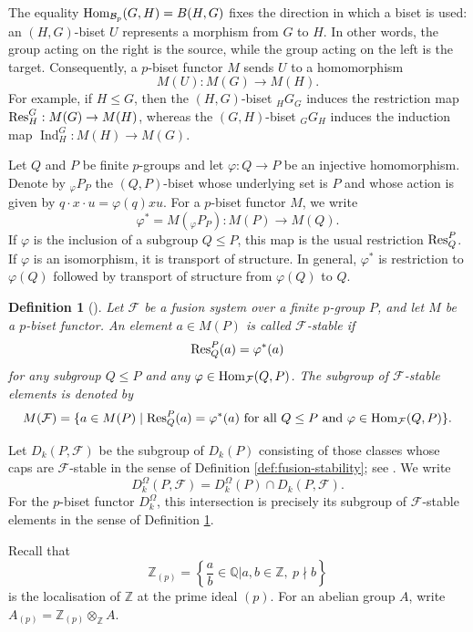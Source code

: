 \documentclass[preprint,12pt,3p]{elsarticle}
\newtheorem{definition}[theorem]{Definition}%
\def\Res{{\rm Res}}
\def\Hom{{\rm Hom}}
\def\F{\mathcal{F}}
\def\Z{\mathbb{Z}}
\begin{document}
The equality $\Hom_{\mathcal{B}_p}(G,H)=B(H,G)$ fixes the direction in which a biset is used: an $(H,G)$-biset $U$ represents a morphism from $G$ to $H$. In other words, the group acting on the right is the source, while the group acting on the left is the target. Consequently, a $p$-biset functor $M$ sends $U$ to a homomorphism
$$
 M(U):M(G)\longrightarrow M(H).
$$
For example, if $H\leq G$, then the $(H,G)$-biset ${}_H G_G$ induces the restriction map $\Res_H^G:M(G)\to M(H)$, whereas the $(G,H)$-biset ${}_G G_H$ induces the induction map $\operatorname{Ind}_H^G:M(H)\to M(G)$.

Let $Q$ and $P$ be finite $p$-groups and let $\varphi:Q\to P$ be an injective homomorphism. Denote by ${}_\varphi P_P$ the $(Q,P)$-biset whose underlying set is $P$ and whose action is given by $q\cdot x\cdot u=\varphi(q)xu$. For a $p$-biset functor $M$, we write
$$
 \varphi^*=M({}_\varphi P_P):M(P)\longrightarrow M(Q).
$$
If $\varphi$ is the inclusion of a subgroup $Q\leq P$, this map is the usual restriction $\Res_Q^P$. If $\varphi$ is an isomorphism, it is transport of structure. In general, $\varphi^*$ is restriction to $\varphi(Q)$ followed by transport of structure from $\varphi(Q)$ to $Q$.

\begin{definition}[{\cite[Definition 2.2]{RY18}}]\label{def:stable-elements}
{\rm Let $\F$ be a fusion system over a finite $p$-group $P$, and let $M$ be a $p$-biset functor. An element $a\in M(P)$ is called {\it $\F$-stable} if
$$
 \Res_Q^P(a)=\varphi^*(a)
$$
for any subgroup $Q\leq P$ and any $\varphi\in\Hom_\F(Q,P)$. The subgroup of $\F$-stable elements is denoted by
$$
 M(\F)=\{a\in M(P)\mid \Res_Q^P(a)=\varphi^*(a)\text{ for all }Q\leq P\text{ and }\varphi\in\Hom_\F(Q,P)\}.
$$}
\end{definition}

Let $D_k(P,\F)$ be the subgroup of $D_k(P)$ consisting of those classes whose caps are $\F$-stable in the sense of Definition \ref{def:fusion-stability}; see \cite[Definition 3.3 and Proposition 3.4]{LM09}. We write
$$
 D_k^\Omega(P,\F)=D_k^\Omega(P)\cap D_k(P,\F).
$$
For the $p$-biset functor $D_k^\Omega$, this intersection is precisely its subgroup of $\F$-stable elements in the sense of Definition \ref{def:stable-elements}.

Recall that
$$
 \Z_{(p)}=\left\{\frac{a}{b}\in\mathbb{Q}\mathrel{\big|}a,b\in\Z,\ p\nmid b\right\}
$$
is the localisation of $\Z$ at the prime ideal $(p)$. For an abelian group $A$, write $A_{(p)}=\Z_{(p)}\otimes_\Z A$.
\end{document}
